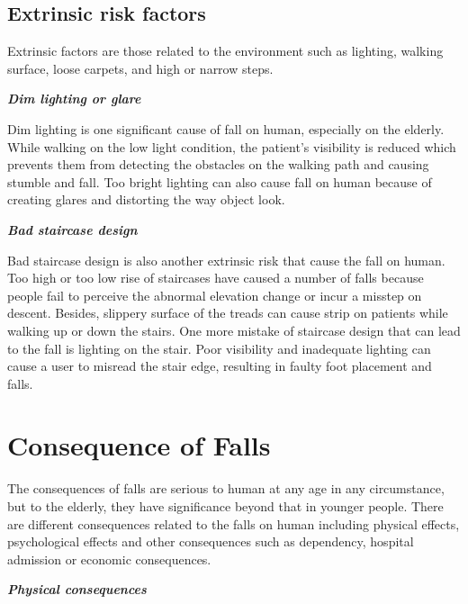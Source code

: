 \documentclass[letterpaper,12pt,titlepage,oneside,final]{book}
\begin{document}
\subsection{Extrinsic risk factors}
Extrinsic factors are those related to the environment such as lighting, walking surface, loose carpets, and high or narrow steps. 

\vspace{0.3cm}
\textbf{\textit{Dim lighting or glare}}\par
Dim lighting is one significant cause of fall on human, especially on the elderly. While walking on the low light condition, the patient's visibility is reduced which prevents them from detecting the obstacles on the walking path and causing stumble and fall. Too bright lighting can also cause fall on human because of creating glares and distorting the way object look. \par
\vspace{0.3cm}
\textbf{\textit{Bad staircase design}}\par

Bad staircase design is also another extrinsic risk that cause the fall on human. Too high or too low rise of staircases have caused a number of falls because people fail to perceive the abnormal elevation change or incur a misstep on descent. Besides, slippery surface of the treads can cause strip on patients while walking up or down the stairs. One more mistake of staircase design that can lead to the fall is lighting on the stair. Poor visibility and inadequate lighting can cause a user to misread the stair edge, resulting in faulty foot placement and falls.
\section{Consequence of Falls}
The consequences of falls are serious to human at any age in any circumstance, but to the elderly, they have significance beyond that in younger people. There are different consequences related to the falls on human including physical effects, psychological effects and other consequences such as dependency, hospital admission or economic consequences. 

\vspace{0.3cm}
\textbf{\textit{Physical consequences}}\par
\end{document}
